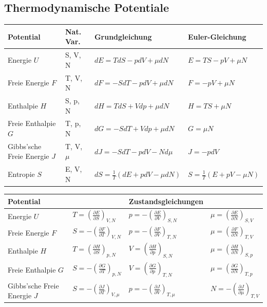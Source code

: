 \documentclass[12pt,a4paper, twoside]{article}
\newcommand{\pd}[2]{\frac{\partial #1}{\partial #2}}
\renewcommand{\=}[1]{\stackrel{#1}{=}}
\theoremstyle{definition}
\theoremstyle{remark}
\begin{document}
\subsection{Thermodynamische Potentiale}

\begin{center}
\begin{framed}
\begin{tabular}{llll}
Potential & Nat. Var. & Grundgleichung & Euler-Gleichung\\
\midrule
Energie $U$ & S, V, N & $dE = T dS - p dV + \mu dN$ & $E = T S - p V + \mu N$\\
Freie Energie $F$ & T, V, N & $dF = -S dT - p dV + \mu dN$ & $F = -pV + \mu N$\\
Enthalpie $H$ & S, p, N & $dH = T dS + V dp + \mu dN$ & $H = TS + \mu N$\\
Freie Enthalpie $G$ & T, p, N & $dG = -S dT + V dp + \mu dN$ & $G = \mu N$\\
\makecell[l]{Gibbs'sche\\ Freie Energie $J$} & T, V, $\mu$ & $dJ = -S dT - p dV - N d\mu$ & $J = -pdV$\\
Entropie $S$ & E, V, N & $dS = \frac{1}{T} (dE + p dV - \mu dN)$ & $S = \frac{1}{T}(E + pV - \mu N)$\\
\end{tabular}
\end{framed}
\end{center}

\begin{center}
\begin{framed}
\noindent \begin{tabular}{llll}
Potential & & Zustandsgleichungen & \\
\midrule
Energie $U$ & $T = (\pd{E}{S})_{V, N}$ & $p = - (\pd{E}{V})_{S, N}$ & $\mu = (\pd{E}{N})_{S, V}$\\
Freie Energie $F$ & $S = -(\pd{F}{T})_{V, N}$ & $p = - (\pd{F}{V})_{T, N}$ & $\mu = (\pd{F}{N})_{T, V}$\\
Enthalpie $H$ & $T = (\pd{H}{S})_{p,N}$ & $V = (\pd{H}{p})_{S,N}$ & $\mu = (\pd{H}{N})_{S,p}$\\
Freie Enthalpie $G$ & $S = -(\pd{G}{T})_{p,N}$ & $V = (\pd{G}{p})_{T,N}$ & $\mu = (\pd{G}{N})_{T,p}$\\
Gibbs'sche Freie Energie $J$ & $S = -(\pd{J}{T})_{V, \mu}$ & $p = -(\pd{J}{V})_{T,\mu}$ & $N = -(\pd{J}{\mu})_{T,V}$\\
\end{tabular}
\end{framed}
\end{center}
\end{document}
